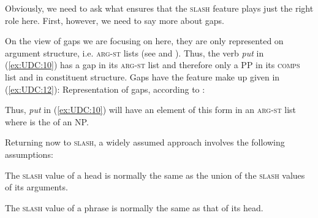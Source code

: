 \documentclass[output=paper
,notxmath 
 	        ,biblatex
                ,babelshorthands
                ,newtxmath
                ,draftmode
                ,colorlinks, citecolor=brown
]{langscibook}
\begin{document}

Obviously, we need to ask what ensures that the \textsc{slash} feature plays just
the right role here. First, however, we need to say more about gaps.

On the view of gaps we are focusing on here, they are only represented
on argument structure, i.e. 
\textsc{arg-st} lists (see  and ). Thus, the verb \emph{put} in (\ref{ex:UDC:10})
 has a gap in its
\textsc{arg-st} list and therefore only a PP in its \textsc{comps} list and
in constituent structure. Gaps have the feature make up given in
(\ref{ex:UDC:12}):
\ea
\label{ex:UDC:12}
Representation of gaps, according to \citet[161]{Pollard:Sag:94}:\\
\z  


\noindent
Thus, \emph{put} in (\ref{ex:UDC:10}) will have an element of this
form in an \textsc{arg-st} list where  is the \localv of an
NP.

Returning now to \textsc{slash}, a widely assumed approach involves the following
assumptions:

\eal
\label{ex:UDC:13}
\ex
The \textsc{slash} value of a head is normally the same as the union of the \textsc{slash} values of its
arguments.

\ex
The \textsc{slash} value of a phrase is normally the same as that of its head.
\zl
\end{document}
